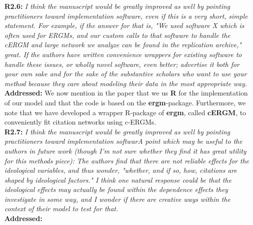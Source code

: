 \documentclass[a4paper,11pt]{texMemo}
\begin{document}
\noindent \textbf{R2.6:} \emph{ I think the manuscript would be greatly improved as well by pointing practitioners toward implementation software, even if this is a very short, simple statement. For example, if the answer for that is, "We used software X which is often used for ERGMs, and our custom calls to that software to handle the cERGM and large network we analyze can be found in the replication archive," great. If the authors have written convenience wrappers for existing software to handle these issues, or wholly novel software, even better; advertise it both for your own sake and for the sake of the substantive scholars who want to use your method because they care about modeling their data in the most appropriate way.}\\

\noindent \textbf{Addressed:} We now mention in the paper that we us \textbf{R} for the implementation of our model and that the code is based on the \textbf{ergm}-package. Furthermore, we note that we have developed a wrapper R-package of \textbf{ergm}, called \textbf{cERGM}, to conveniently fit citation networks using c-ERGMs.  \\

\noindent \textbf{R2.7:} \emph{ I think the manuscript would be greatly improved as well by pointing practitioners toward implementation softwarA point which may be useful to the authors in future work (though I'm not sure whether they find it has great utility for this methods piece): The authors find that there are not reliable effects for the ideological variables, and thus wonder, "whether, and if so, how, citations are shaped by ideological factors." I think one natural response could be that the ideological effects may actually be found within the dependence effects they investigate in some way, and I wonder if there are creative ways within the context of their model to test for that.}\\

\noindent \textbf{Addressed:}  \\


\printbibliography
\end{document}
